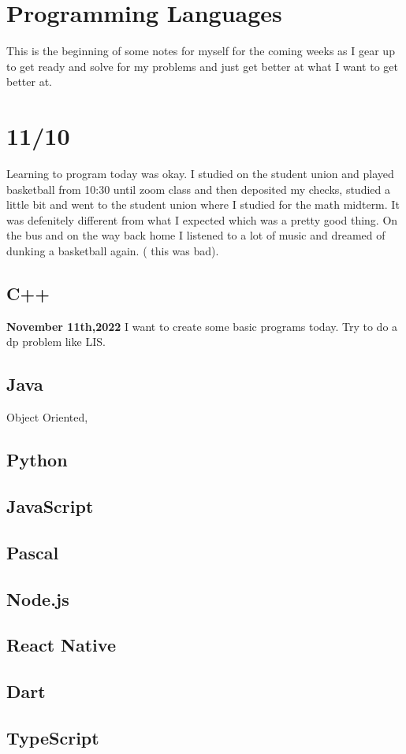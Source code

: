 \documentclass[11pt]{scrartcl}
\begin{document}
\section{Programming Languages}
This is the beginning of some notes for myself for the coming weeks as I gear up to get ready and solve for my problems and just get better at what I want to get better at.
\section{11/10}
Learning to program today was okay. I studied on the student union and played basketball from 10:30 until zoom class and then deposited my checks, studied a little bit and went to the student union where I studied for the math midterm. It was defenitely different from what I expected which was a pretty good thing. On the bus and on the way back home I listened to a lot of music and dreamed of dunking a basketball again. ( this was bad).
\subsection{C++}
\textbf{November 11th,2022} I want to create some basic programs today. Try to do a dp problem like LIS. 
\subsection{Java}
Object Oriented,
\subsection{Python}
\subsection{JavaScript}
\subsection{Pascal}
\subsection{Node.js}
\subsection{React Native}
\subsection{Dart}
\subsection{TypeScript}
\end{document}
